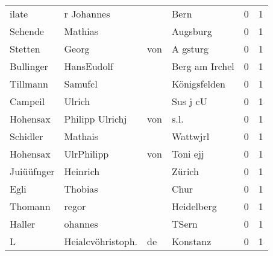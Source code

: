 \begin{tabular}{llllrr}
                    ilate &                         r Johannes &             &                                        Bern &          0 &         1 \\
                  Sehende &                            Mathias &             &                                    Augsburg &          0 &         1 \\
                  Stetten &                              Georg &         von &                                    A gsturg &          0 &         1 \\
                Bullinger &                         HansEudolf &             &                              Berg am Irchel &          0 &         1 \\
                 Tillmann &                            Samufcl &             &                                Königsfelden &          0 &         1 \\
                  Campeil &                             Ulrich &             &                                    Sus j cU &          0 &         1 \\
                 Hohensax &                    Philipp Ulrichj &         von &                                        s.l. &          0 &         1 \\
                 Schidler &                            Mathais &             &                                    Wattwjrl &          0 &         1 \\
                 Hohensax &                         UlrPhilipp &         von &                                    Toni ejj &          0 &         1 \\
               Juiüüfnger &                           Heinrich &             &                                      Zürich &          0 &         1 \\
                     Egli &                            Thobias &             &                                        Chur &          0 &         1 \\
                  Thomann &                              regor &             &                                  Heidelberg &          0 &         1 \\
                   Haller &                            ohannes &             &                                       TSern &          0 &         1 \\
                        L &                  Heialcvöhristoph. &          de &                                    Konstanz &          0 &         1 \\

\end{tabular}
